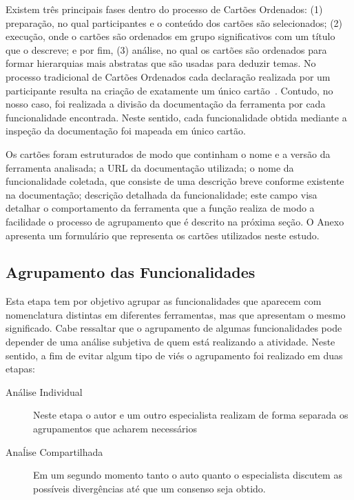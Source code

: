 Existem três principais fases dentro do processo de Cartões Ordenados: (1)
preparação, no qual participantes e o conteúdo dos cartões são selecionados; (2)
execução, onde o cartões são ordenados em grupo significativos com um título que
o descreve; e por fim, (3) análise, no qual os cartões são ordenados para
formar hierarquias mais abstratas que são usadas para deduzir temas. No processo
tradicional de Cartões Ordenados cada declaração realizada por um
participante resulta na criação de exatamente um único
cartão~\cite{just2008towards}. Contudo, no nosso caso, foi realizada a divisão
da documentação da ferramenta por cada funcionalidade encontrada. Neste sentido,
cada funcionalidade obtida mediante a inspeção da documentação foi mapeada em
único cartão.

Os cartões foram estruturados de modo que continham o nome e a versão da
ferramenta analisada; a URL da documentação utilizada; o nome da funcionalidade
coletada, que consiste de uma descrição breve conforme existente na
documentação; descrição detalhada da funcionalidade; este campo visa detalhar o
comportamento da ferramenta que a função realiza de modo a facilidade o processo
de agrupamento que é descrito na próxima seção. O Anexo apresenta um formulário
que representa os cartões utilizados neste estudo.

\subsection{Agrupamento das Funcionalidades}
\label{subsec:agrupamento_fucionalidades}

Esta etapa tem por objetivo agrupar as funcionalidades que aparecem com
nomenclatura distintas em diferentes ferramentas, mas que apresentam o mesmo
significado. Cabe ressaltar que o agrupamento de algumas funcionalidades pode
depender de uma análise subjetiva de quem está realizando a atividade. Neste
sentido, a fim de evitar algum tipo de viés o agrupamento foi realizado em duas
etapas:

\begin{description}
	\item[Análise Individual] Neste etapa o autor e um outro especialista
		realizam de forma separada os agrupamentos que acharem necessários
	\item[Anaĺise Compartilhada] Em um segundo momento tanto o auto quanto o
		especialista discutem as possíveis divergências até que um consenso seja
		obtido.
\end{description}

